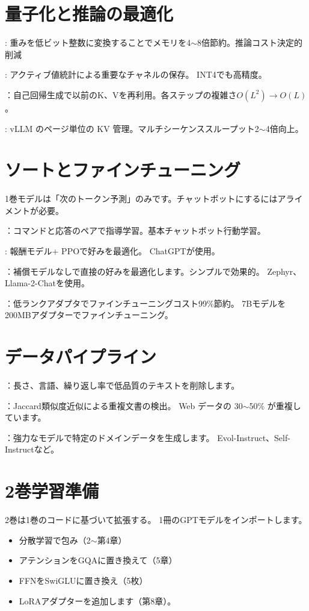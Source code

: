 \section{量子化と推論の最適化}

: 重みを低ビット整数に変換することでメモリを4$\sim$8倍節約。推論コスト決定的削減

: アクティブ値統計による重要なチャネルの保存。 INT4でも高精度。

：自己回帰生成で以前のK、Vを再利用。各ステップの複雑さ$O(L^2) \to O(L)$。

: vLLM のページ単位の KV 管理。マルチシーケンススループット2$\sim$4倍向上。

\section{ソートとファインチューニング}

1巻モデルは「次のトークン予測」のみです。チャットボットにするにはアライメントが必要。

：コマンドと応答のペアで指導学習。基本チャットボット行動学習。

: 報酬モデル+ PPOで好みを最適化。 ChatGPTが使用。

：補償モデルなしで直接の好みを最適化します。シンプルで効果的。 Zephyr、Llama-2-Chatを使用。

：低ランクアダプタでファインチューニングコスト99\%節約。 7Bモデルを200MBアダプターでファインチューニング。

\section{データパイプライン}

：長さ、言語、繰り返し率で低品質のテキストを削除します。

：Jaccard類似度近似による重複文書の検出。 Web データの 30$\sim$50\% が重複しています。

：強力なモデルで特定のドメインデータを生成します。 Evol-Instruct、Self-Instructなど。

\section{2巻学習準備}

2巻は1巻のコードに基づいて拡張する。 1冊のGPTモデルをインポートします。
\begin{itemize}
\item 分散学習で包み（2$\sim$第4章）
\item アテンションをGQAに置き換えて（5章）
\item FFNをSwiGLUに置き換え（5枚）
\item LoRAアダプターを追加します（第8章）。
\end{itemize}

